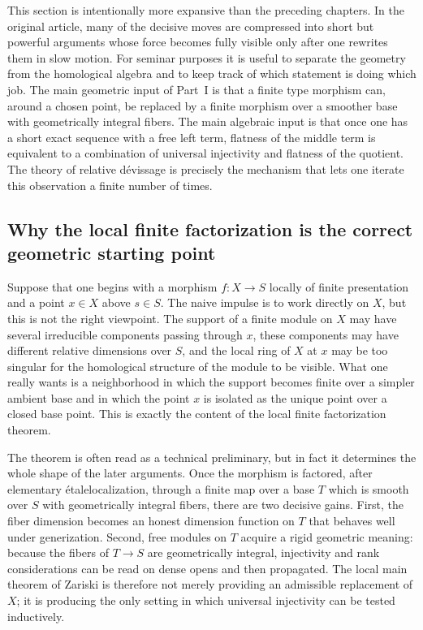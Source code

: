 \documentclass[11pt,oneside]{article}
\newcommand{\etale}{\'etale}
\begin{document}
This section is intentionally more expansive than the preceding chapters.  In the original article, many of the decisive moves are compressed into short but powerful arguments whose force becomes fully visible only after one rewrites them in slow motion.  For seminar purposes it is useful to separate the geometry from the homological algebra and to keep track of which statement is doing which job.  The main geometric input of Part~I is that a finite type morphism can, around a chosen point, be replaced by a finite morphism over a smoother base with geometrically integral fibers.  The main algebraic input is that once one has a short exact sequence with a free left term, flatness of the middle term is equivalent to a combination of universal injectivity and flatness of the quotient.  The theory of relative d\'evissage is precisely the mechanism that lets one iterate this observation a finite number of times.

\subsection{Why the local finite factorization is the correct geometric starting point}

Suppose that one begins with a morphism $f\colon X\to S$ locally of finite presentation and a point $x\in X$ above $s\in S$.  The naive impulse is to work directly on $X$, but this is not the right viewpoint.  The support of a finite module on $X$ may have several irreducible components passing through $x$, these components may have different relative dimensions over $S$, and the local ring of $X$ at $x$ may be too singular for the homological structure of the module to be visible.  What one really wants is a neighborhood in which the support becomes finite over a simpler ambient base and in which the point $x$ is isolated as the unique point over a closed base point.  This is exactly the content of the local finite factorization theorem.

The theorem is often read as a technical preliminary, but in fact it determines the whole shape of the later arguments.  Once the morphism is factored, after elementary \etale localization, through a finite map over a base $T$ which is smooth over $S$ with geometrically integral fibers, there are two decisive gains.  First, the fiber dimension becomes an honest dimension function on $T$ that behaves well under generization.  Second, free modules on $T$ acquire a rigid geometric meaning: because the fibers of $T\to S$ are geometrically integral, injectivity and rank considerations can be read on dense opens and then propagated.  The local main theorem of Zariski is therefore not merely providing an admissible replacement of $X$; it is producing the only setting in which universal injectivity can be tested inductively.
\end{document}
